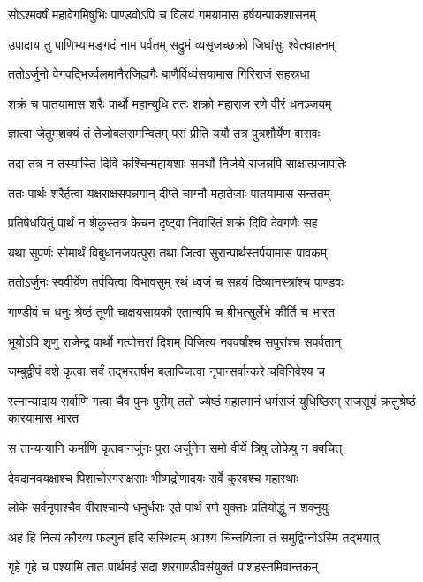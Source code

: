 \twolineshloka
{सोऽश्मवर्षं महावेगमिषुभिः पाण्डवोऽपि च}
{विलयं गमयामास हर्षयन्पाकशासनम्}


\twolineshloka
{उपादाय तु पाणिभ्यामङ्गदं नाम पर्वतम्}
{सद्रुमं व्यसृजच्छक्रो जिघांसुः श्वेतवाहनम्}


\twolineshloka
{ततोऽर्जुनो वेगवद्भिर्ज्वलमानैरजिह्यगैः}
{बाणैर्विध्वंसयामास गिरिराजं सहस्रधा}


\twolineshloka
{शक्रं च पातयामास शरैः पार्थो महान्युधि}
{ततः शक्रो महाराज रणे वीरं धनञ्जयम्}


\twolineshloka
{ज्ञात्वा जेतुमशक्यं तं तेजोबलसमन्वितम्}
{परां प्रीति ययौ तत्र पुत्रशौर्येण वासवः}


\twolineshloka
{तदा तत्र न तस्यास्ति दिवि कश्चिन्महायशाः}
{समर्थो निर्जये राजन्नपि साक्षात्प्रजापतिः}


\twolineshloka
{ततः पार्थः शरैर्हत्वा यक्षराक्षसपन्नगान्}
{दीप्ते चाग्नौ महातेजाः पातयामास सन्ततम्}


\twolineshloka
{प्रतिषेधयितुं पार्थं न शेकुस्तत्र केचन}
{दृष्ट्वा निवारितं शक्रं दिवि देवगणैः सह}


\twolineshloka
{यथा सुपर्णः सोमार्थं विबुधानजयत्पुरा}
{तथा जित्वा सुरान्पार्थस्तर्पयामास पावकम्}


\twolineshloka
{ततोऽर्जुनः स्ववीर्येण तर्पयित्वा विभावसुम्}
{रथं ध्वजं च सहयं दिव्यानस्त्रांश्च पाण्डवः}


\twolineshloka
{गाण्डीवं च धनुः श्रेष्ठं तूणी चाक्षयसायकौ}
{एतान्यपि च बीभत्सुर्लेभे कीर्ति च भारत}


\twolineshloka
{भूयोऽपि शृणु राजेन्द्र पार्थो गत्वोत्तरां दिशम्}
{विजित्य नववर्षांश्च सपुरांश्च सपर्वतान्}


\twolineshloka
{जम्बुद्वीपं वशे कृत्वा सर्वं तद्भरतर्षभ}
{बलाज्जित्वा नृपान्सर्वान्करे चविनिवेश्य च}


\threelineshloka
{रत्नान्यादाय सर्वाणि गत्वा चैव पुनः पुरीम्}
{ततो ज्येष्ठं महात्मानं धर्मराजं युधिष्ठिरम्}
{राजसूयं क्रतुश्रेष्ठं कारयामास भारत}


\twolineshloka
{स तान्यन्यानि कर्माणि कृतवानर्जुनः पुरा}
{अर्जुनेन समो वीर्ये त्रिषु लोकेषु न क्वचित्}


\twolineshloka
{देवदानवयक्षाश्च पिशाचोरगराक्षसाः}
{भीष्मद्रोणादयः सर्वे कुरवश्च महारथाः}


\twolineshloka
{लोके सर्वनृपाश्चैव वीराश्चान्ये धनुर्धराः}
{एते पार्थं रणे युक्ताः प्रतियोद्धुं न शक्नुयुः}


\twolineshloka
{अहं हि नित्यं कौरव्य फल्गुनं हृदि संस्थितम्}
{अपश्यं चिन्तयित्वा तं समुद्विग्नोऽस्मि तद्भयात्}


\twolineshloka
{गृहे गृहे च पश्यामि तात पार्थमहं सदा}
{शरगाण्डीवसंयुक्तं पाशहस्तमिवान्तकम्}


